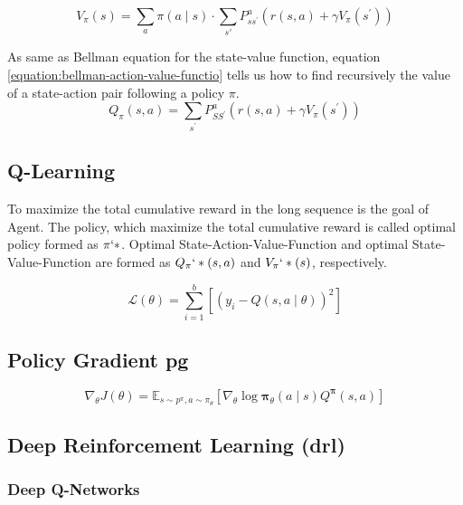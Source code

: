 \begin{equation} \label{equation:bellman-state-value-function}
V_{\pi}(s)=\sum_{a} \pi(a \mid s) \cdot \sum_{s \prime} P_{s s^{\prime}}^{a}\left(r(s, a)+\gamma V_{\pi}\left(s^{\prime}\right)\right)
\end{equation}

As same as Bellman equation for the state-value function, equation \ref{equation:bellman-action-value-functio} tells us how to find recursively the value of a state-action pair following a policy $\pi$.
\begin{equation} \label{equation:bellman-action-value-function}
Q_{\pi}(s, a)=\sum_{s^{\prime}} P_{S S^{\prime}}^{a}\left(r(s, a)+\gamma V_{\pi}\left(s^{\prime}\right)\right)
\end{equation}

\subsection{Q-Learning}
To maximize the total cumulative reward in the long sequence is the goal of Agent. The policy, which maximize the total cumulative reward is called optimal policy formed as $\pi`*$. Optimal State-Action-Value-Function and optimal State-Value-Function are formed as $Q_\pi`*(s, a)$ and $V_\pi`*(s)$, respectively.

\begin{equation}
\mathcal{L}(\theta)=\sum_{i=1}^{b}\left[\left(y_{i}-Q(s, a \mid \theta)\right)^{2}\right]
\end{equation}
\subsection{Policy Gradient \gls{pg}}
\begin{equation}
\nabla_{\theta} J(\theta)=\mathbb{E}_{s \sim p^{\pi}, a \sim \pi_{\theta}}\left[\nabla_{\theta} \log \boldsymbol{\pi}_{\theta}(a \mid s) Q^{\boldsymbol{\pi}}(s, a)\right]
\end{equation}

\subsection{Deep Reinforcement Learning (\gls{drl})}
\subsubsection{Deep Q-Networks}

